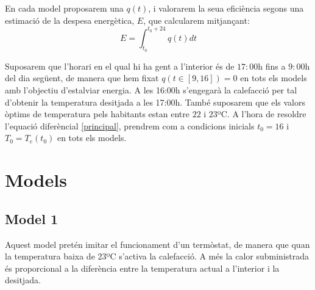 \documentclass[11pt]{article}
\begin{document}
En cada model proposarem una $q(t)$, i valorarem la seua eficiència segons una estimació de la despesa energètica, $E$, que calcularem mitjançant:\\
\begin{equation}\label{gasto}
	E=\int^{t_0+24}_{t_0} q(t)dt
\end{equation}

Suposarem que l'horari en el qual hi ha gent a l'interior és de $17:00$h fins a $9:00$h del dia següent, de manera que hem fixat $q(t\in[9,16])=0$ en tots els models amb l'objectiu d'estalviar energia. A les 16:00h s'engegarà la calefacció per tal d'obtenir la temperatura desitjada a les 17:00h. També suposarem que els valors òptims de temperatura pels habitants estan entre $22$ i $23$ºC. A l'hora de resoldre l'equació diferèncial \eqref{principal}, prendrem com a condicions inicials $t_0=16$ i $T_0=T_e(t_0)$ en tots els models.\\
\section*{Models}
	\subsection{Model 1}
	Aquest model pretén imitar el funcionament d'un termòstat, de manera que quan la temperatura baixa de $23$ºC s'activa la calefacció. A més la calor subministrada és proporcional a la diferència entre la temperatura actual a l'interior i la desitjada.
\end{document}
